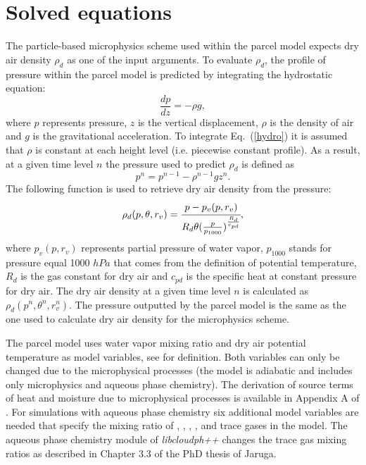 \documentclass[11pt]{article}
\begin{document}
\section{Solved equations}\label{sec:eqs}

The particle-based microphysics scheme used within the parcel model 
  expects dry air density $\rho_d$ as one of the input arguments.
To evaluate $\rho_d$, the profile of pressure within the parcel model 
  is predicted by integrating the hydrostatic equation:
\begin{equation}
	\frac{dp}{dz} = -\rho g,
	\label{hydro}
\end{equation}
\noindent
  where $p$ represents pressure, 
        $z$  is the vertical displacement, 
        $\rho$ is the density of air and
        $g$ is the gravitational acceleration.
To integrate Eq.~(\ref{hydro}) it is assumed that $\rho$ is constant
  at each height level (i.e. piecewise constant profile). 
As a result, at a given time level $n$ the pressure used to predict $\rho_d$ is defined as
  \begin{equation*}
    p^n = p^{n-1} - \rho^{n-1} g z^n .
  \end{equation*}
\noindent
The following function is used to retrieve dry air density from the pressure:
\begin{equation}
  \rho_{d}(p, \theta, r_v) = \cfrac{p - p_v(p, r_v)}{ R_d \theta (\frac{p}{p_{1000}})^{\frac{R_d}{c_{pd}}}},
  \label{rho}
\end{equation}
\noindent
where 
  $p_v(p, r_v)$ represents partial pressure of water vapor, 
  $p_{1000}$ stands for pressure equal 1000 $hPa$ that comes from the definition of potential temperature,
  $R_d$ is the gas constant for dry air and
  $c_{pd}$ is the specific heat at constant pressure for dry air.
The dry air density at a given time level $n$ is calculated as $\rho_d(p^n, \theta^n, r_v^n)$. 
The pressure outputted by the parcel model is the same 
  as the one used to calculate dry air density for the microphysics scheme.

The parcel model uses water vapor mixing ratio and dry air potential temperature
  as model variables, see \citet{Arabas_et_al_2015} for definition.
Both variables can only be changed due to the microphysical processes
  (the model is adiabatic and includes only microphysics and aqueous phase chemistry).
The derivation of source terms of heat and moisture due to microphysical processes 
  is available in Appendix A of \citep{Arabas_et_al_2015}.
For simulations with aqueous phase chemistry six additional model variables are needed
  that specify the mixing ratio of , , , ,  and  
  trace gases in the model.
The aqueous phase chemistry module of \emph{libcloudph++} changes the
  trace gas mixing ratios as described in Chapter 3.3 of the PhD thesis of Jaruga.
\end{document}
